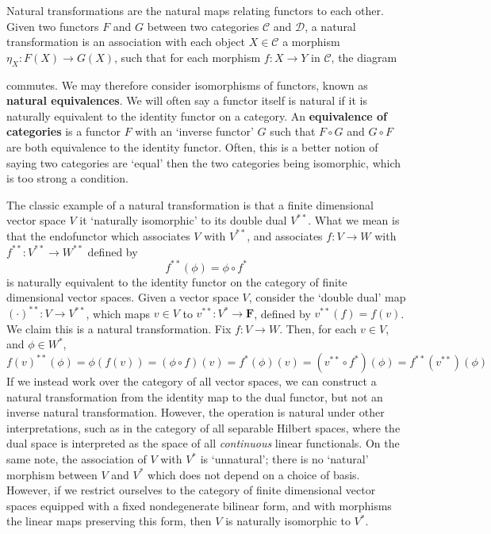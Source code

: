 Natural transformations are the natural maps relating functors to each other. Given two functors $F$ and $G$ between two categories $\mathcal{C}$ and $\mathcal{D}$, a natural transformation is an association with each object $X \in \mathcal{C}$ a morphism $\eta_X: F(X) \to G(X)$, such that for each morphism $f: X \to Y$ in $\mathcal{C}$, the diagram
%
\begin{center}
\end{center}
%
commutes. We may therefore consider isomorphisms of functors, known as {\bf natural equivalences}. We will often say a functor itself is natural if it is naturally equivalent to the identity functor on a category. An {\bf equivalence of categories} is a functor $F$ with an `inverse functor' $G$ such that $F \circ G$ and $G \circ F$ are both equivalence to the identity functor. Often, this is a better notion of saying two categories are `equal' then the two categories being isomorphic, which is too strong a condition.

\begin{example}
    The classic example of a natural transformation is that a finite dimensional vector space $V$ it `naturally isomorphic' to its double dual $V^{**}$. What we mean is that the endofunctor which associates $V$ with $V^{**}$, and associates $f: V \to W$ with $f^{**}: V^{**} \to W^{**}$ defined by
    \[ f^{**}(\phi) = \phi \circ f^* \]
    is naturally equivalent to the identity functor on the category of finite dimensional vector spaces. Given a vector space $V$, consider the `double dual' map $(\cdot)^{**}: V \to V^{**}$, which maps $v \in V$ to $v^{**}: V^* \to \mathbf{F}$, defined by $v^{**}(f) = f(v)$. We claim this is a natural transformation. Fix $f: V \to W$. Then, for each $v \in V$, and $\phi \in W^*$,
    \[ f(v)^{**}(\phi) = \phi(f(v)) = (\phi \circ f)(v) = f^*(\phi)(v) = (v^{**} \circ f^*)(\phi) = f^{**}(v^{**})(\phi) \]
    If we instead work over the category of all vector spaces, we can construct a natural transformation from the identity map to the dual functor, but not an inverse natural transformation. However, the operation is natural under other interpretations, such as in the category of all separable Hilbert spaces, where the dual space is interpreted as the space of all {\it continuous} linear functionals. On the same note, the association of $V$ with $V^*$ is `unnatural'; there is no `natural' morphism between $V$ and $V^*$ which does not depend on a choice of basis. However, if we restrict ourselves to the category of finite dimensional vector spaces equipped with a fixed nondegenerate bilinear form, and with morphisms the linear maps preserving this form, then $V$ is naturally isomorphic to $V^*$.
\end{example}

